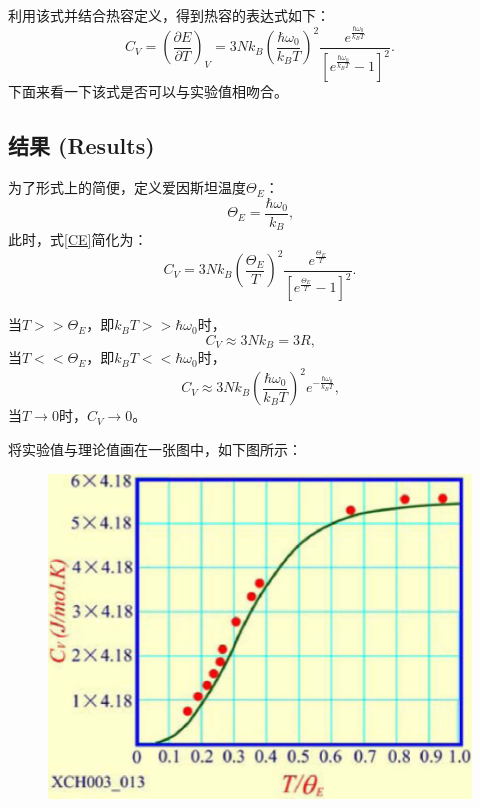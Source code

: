 \documentclass[declarePage]{ecnuthesis}
\begin{document}
利用该式并结合热容定义，得到热容的表达式如下：
\begin{equation}
    C_V = \left( \frac{\partial E}{\partial T} \right) _V = 3N k_B \left( \frac{\hbar \omega_0}{k_BT}\right) ^2 \frac{e^{\frac{\hbar \omega_0}{k_BT}}}{\left[e^ \frac{\hbar \omega_0}{k_BT}-1 \right]^2} \text{.} \label{CE}
\end{equation}
下面来看一下该式是否可以与实验值相吻合。

\subsection{结果 (Results)}

为了形式上的简便，定义爱因斯坦温度$\Theta _E$：
\begin{equation}
    \Theta _E = \frac{\hbar \omega_0}{k_B} \text{,} 
\end{equation}
此时，式\ref{CE}简化为：
\begin{equation}
    C_V = 3N k_B \left( \frac{\Theta _E}{T}\right) ^2 \frac{e^{\frac{\Theta _E}{T}}}{\left[e^ \frac{\Theta _E}{T}-1 \right]^2} \text{.}
\end{equation}

当$T>>\Theta _E$，即$k_B T>>\hbar \omega_0$时，
\begin{equation}
    C_V \approx 3N k_B = 3R \text{,}
\end{equation}
当$T<<\Theta _E$，即$k_B T<<\hbar \omega_0$时，
\begin{equation}
    C_V \approx 3N k_B \left( \frac{\hbar \omega_0}{k_BT}\right) ^2 e^{-\frac{\hbar \omega_0}{k_BT}} \text{,}
\end{equation}
当$T \rightarrow 0$时，$C_V \rightarrow 0$。

将实验值与理论值画在一张图中，如下图所示：
\begin{figure}[htb]
    \centering
    \includegraphics[width=.5\textwidth]{CES.png}
\end{figure}
\end{document}
